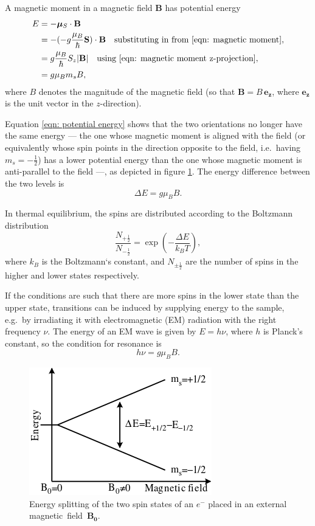 \documentclass[a4paper]{jpconf}
\numberwithin{equation}{section}
\begin{document}
A magnetic moment in a magnetic field $\mathbf{B}$ has potential energy
\begin{align}
	E &= - \bm{\mu}_S \cdot \mathbf{B} \nonumber \\
	  &= - (- g \frac{\mu_B}{\hbar} \mathbf{S})\cdot\mathbf{B} \quad \text{substituting in from \eqref{eqn: magnetic moment}}, \nonumber \\
	  &= g \frac{\mu_B}{\hbar}S_z \lvert \mathbf{B} \rvert \quad \text{using \eqref{eqn: magnetic moment z-projection}}, \nonumber \\
	  &= g\mu_Bm_sB \label{eqn: potential energy},
\end{align}
where $B$ denotes the magnitude of the magnetic field (so that $\mathbf{B} = B \, \mathbf{e_z}$, where $\mathbf{e_z}$ is the unit vector in the $z$-direction).

Equation \eqref{eqn: potential energy} shows that the two orientations no longer have the same energy --- the one whose magnetic moment is aligned with the field (or equivalently whose spin points in the direction opposite to the field, i.e.\ having $m_s = -\tfrac12$) has a lower potential energy than the one whose magnetic moment is anti-parallel to the field ---, as depicted in figure \ref{fig: energy splitting}. The energy difference between the two levels is 
\begin{equation}
	\Delta E = g \mu_B B. \label{eqn: energy difference}
\end{equation}

In thermal equilibrium, the spins are distributed according to the Boltzmann distribution
\[
    \frac{N_{+\tfrac12}}{N_{-\tfrac12}} = \exp(- \frac{\Delta E}{k_B T}),
\]
where $k_B$ is the Boltzmann\textquoteleft s constant, and $N_{\pm\tfrac12}$ are the number of spins in the higher and lower states respectively. 

If the conditions are such that there are more spins in the lower state than the upper state, transitions can be induced by supplying energy to the sample, e.g.\ by irradiating it with electromagnetic (EM) radiation with the right frequency $\nu$. The energy of an EM wave is given by $E = h \nu$, where $h$ is Planck's constant, so the condition for resonance is
\begin{equation}
	h\nu = g\mu_B B. \label{eqn: resonance condition}
\end{equation}

\begin{figure}[htbp]
	\includegraphics{EPR_splitting.png}
	\caption{Energy splitting of the two spin states of an $e^-$ placed in an external magnetic~field~$\mathbf{B_0}$.}
	\label{fig: energy splitting}
\end{figure}
\end{document}
